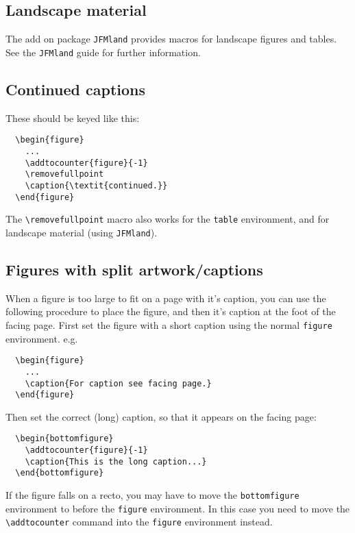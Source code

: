 \documentclass{jfm}
\newcommand\eg{e.g.\ }
\begin{document}
\ifCUPmtlplainloaded

\subsection{Landscape material}

The add on package \verb"JFMland" provides macros for landscape figures and
tables. See the \verb"JFMland" guide for further information.

\subsection{Continued captions}

These should be keyed like this:
\begin{verbatim}
  \begin{figure}
    ...
    \addtocounter{figure}{-1}
    \removefullpoint
    \caption{\textit{continued.}}
  \end{figure}
\end{verbatim}
The \verb"\removefullpoint" macro also works for the \verb"table"
environment, and for landscape material (using \verb"JFMland").

\subsection{Figures with split artwork/captions}

When a figure is too large to fit on a page with it's caption, you can use
the following procedure to place the figure, and then it's caption at the foot
of the facing page. First set the figure with a short caption
using the normal \verb"figure" environment. \eg
\begin{verbatim}
  \begin{figure}
    ...
    \caption{For caption see facing page.}
  \end{figure}
\end{verbatim}
Then set the correct (long) caption, so that it appears on the facing page:
\begin{verbatim}
  \begin{bottomfigure}
    \addtocounter{figure}{-1}
    \caption{This is the long caption...}
  \end{bottomfigure}
\end{verbatim}
If the figure falls on a recto, you may have to move the \verb"bottomfigure"
environment to before the \verb"figure" environment. In this case you need to
move the \verb"\addtocounter" command into the \verb"figure" environment
instead.
\end{document}
